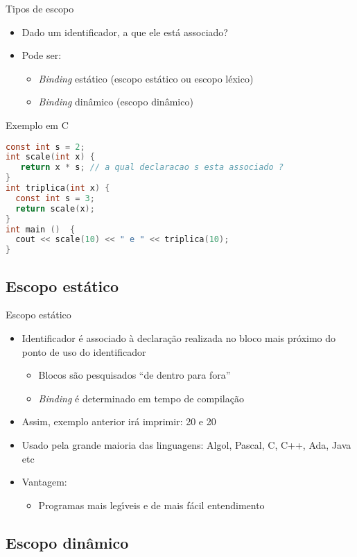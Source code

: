\documentclass[handout,aspectratio=169]{beamer}
\newcommand{\bi}{\begin{itemize}[<+->]}
\newcommand{\ei}{\end{itemize}}
\begin{document}
\begin{frame}[fragile]{Tipos de escopo}

   \bi 
   \item Dado um identificador, a que ele est\'{a} associado?
   \item Pode ser:
      \bi 
      \item  \emph{Binding} est\'{a}tico (escopo est\'{a}tico ou escopo l\'{e}xico)
      \item  \emph{Binding} din\^{a}mico (escopo din\^{a}mico)
      \ei
	\ei
	
 \begin{block}{Exemplo em C}
 \tiny
	\begin{lstlisting}[language=C,numbers=none]
const int s = 2;
int scale(int x) { 
   return x * s; // a qual declaracao s esta associado ?
} 
int triplica(int x) {
  const int s = 3;
  return scale(x);
}
int main ()  { 
  cout << scale(10) << " e " << triplica(10); 
}
\end{lstlisting}
\end{block}	

\end{frame}


\subsection{Escopo est\'{a}tico}

\begin{frame}{Escopo est\'{a}tico}

   \bi 
   \item Identificador \'{e} associado à declara\c{c}\~{a}o realizada no bloco mais pr\'{o}ximo do ponto de uso do identificador
      \bi 
      \item Blocos s\~{a}o pesquisados ``de dentro para fora''
      \item  \emph{Binding} \'{e} determinado em tempo de compila\c{c}\~{a}o
      \ei
   \item Assim, exemplo anterior ir\'{a} imprimir: 20 e 20
   \item Usado pela grande maioria das linguagens: Algol, Pascal, C, C++, Ada, Java etc
   \item Vantagem:
      \bi 
      \item  Programas mais leg\'{\i}veis e de mais f\'{a}cil entendimento
      \ei
   \ei
\end{frame}

\subsection{Escopo din\^{a}mico}
\end{document}
